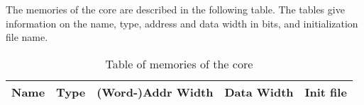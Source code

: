 
    The memories of the core are described in the following table.
    The tables give information on the name, type, address and data width in bits, and initialization file name.

    \begin{table}[H]
      \centering
      \begin{tabularx}{\textwidth}{|l|c|c|c|X|}
        \hline
        \rowcolor{iob-green}
        {\bf Name} & {\bf Type} & {\bf (Word-)Addr Width} & {\bf Data Width} & {\bf Init file} \\ \hline
        
      \end{tabularx}
      \caption{Table of memories of the core}
      \label{mems_tab:is}
    \end{table}
\clearpage